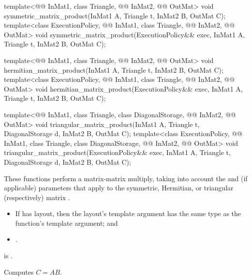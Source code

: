 \begin{itemdecl}
template<@@ InMat1, class Triangle, @@ InMat2, @@ OutMat>
  void symmetric_matrix_product(InMat1 A, Triangle t, InMat2 B, OutMat C);
template<class ExecutionPolicy,
         @@ InMat1, class Triangle, @@ InMat2, @@ OutMat>
  void symmetric_matrix_product(ExecutionPolicy&& exec, InMat1 A, Triangle t, InMat2 B, OutMat C);

template<@@ InMat1, class Triangle, @@ InMat2, @@ OutMat>
  void hermitian_matrix_product(InMat1 A, Triangle t, InMat2 B, OutMat C);
template<class ExecutionPolicy,
         @@ InMat1, class Triangle, @@ InMat2, @@ OutMat>
  void hermitian_matrix_product(ExecutionPolicy&& exec, InMat1 A, Triangle t, InMat2 B, OutMat C);

template<@@ InMat1, class Triangle, class DiagonalStorage,
         @@ InMat2, @@ OutMat>
  void triangular_matrix_product(InMat1 A, Triangle t, DiagonalStorage d, InMat2 B, OutMat C);
template<class ExecutionPolicy, @@ InMat1, class Triangle, class DiagonalStorage,
         @@ InMat2, @@ OutMat>
  void triangular_matrix_product(ExecutionPolicy&& exec,
                                 InMat1 A, Triangle t, DiagonalStorage d, InMat2 B, OutMat C);
\end{itemdecl}

\begin{itemdescr}
\pnum
These functions perform a matrix-matrix multiply,
taking into account
the  and  (if applicable) parameters
that apply to the symmetric, Hermitian, or triangular (respectively) matrix .

\pnum
\mandates
\begin{itemize}
\item
If  has  layout,
then the layout's  template argument has
the same type as the function's  template argument; and
\item
{}.
\end{itemize}

\pnum
\expects
{} is .

\pnum
\effects
Computes $C = A B$.
\end{itemdescr}

